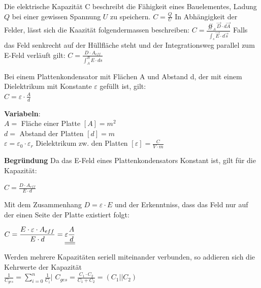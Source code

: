 \beginip
Die elektrische Kapazität C beschreibt die Fähigkeit eines Bauelementes, Ladung $Q$ bei einer gewissen Spannung $U$ zu speichern.
\formulaBegin
$C =\displaystyle \frac{Q}{U}$
\formulaEnd
In Abhängigkeit der Felder, lässt sich die Kaazität folgendermassen beschreiben:
\formulaBegin
$ C = \displaystyle \frac{\oiint_A \vec{D} \cdot d \vec{A} }{ \int_s \vec{E} \cdot d\vec{s}}$
\formulaEnd
Falls das Feld senkrecht auf der Hüllfläche steht und der Integrationsweg parallel zum E-Feld verläuft gilt:
\formulaBegin
$ C= \displaystyle \frac{D \cdot A_{eff} } {\int_A^B E \cdot ds} $
\formulaEnd
\iend


\begingl
Bei einem Plattenkondensator mit Flächen A und Abstand d, der mit einem Dielektrikum mit Konstante $\varepsilon$ gefüllt ist, gilt: \\
\formulaBegin
$ \displaystyle C = \varepsilon \cdot \frac{A}{ d}$
\formulaEnd

\textbf{Variabeln}: \\
$A = $ Fläche einer Platte $ [A] = m^2 $ \\
$d = $ Abstand der Platten $ [d] = m$ \\
$ \varepsilon = \varepsilon_0 \cdot \varepsilon_r $ Dielektrikum zw. den Platten $ [\varepsilon] = \frac{C}{V\cdot m}$ \\

\iend

\textbf{Begründung}
Da das E-Feld eines Plattenkondensators Konstant ist, gilt für die Kapazität:
\fix
\fix
\begin{center}
	$ C= \displaystyle \frac{D \cdot A_{eff} } {E \cdot d} $
\end{center}
\fix
\fix
Mit dem Zusammenhang $ D = \varepsilon \cdot E$ und der Erkenntniss, dass das Feld nur auf der einen Seite der Platte existiert folgt:
\fix \fix
\begin{center}
	$ C= \displaystyle \frac{E \cdot \varepsilon \cdot A_{eff} } {E  \cdot d}  = \underline{\underline{\displaystyle \varepsilon \frac{A} { d}}}$
\end{center}




\beginip
Werden mehrere Kapazitäten seriell miteinander verbunden, so addieren sich die Kehrwerte der Kapazität \\
\formulaBegin
$\displaystyle \frac{1}{C_{ges}} = \sum_{i=0}^n \frac{1}{C_i} \Bigg\rvert$
$\displaystyle C_{ges} = \frac{C_1 \cdot C_2}{C_1 + C_2} = (C_1 || C_2)$
\formulaEnd
\iend


